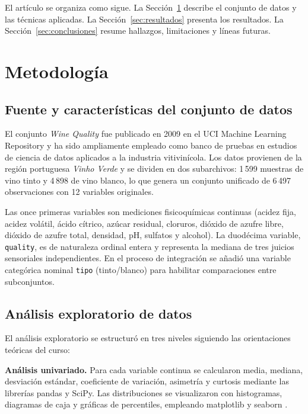 \documentclass[conference]{IEEEtran}
\begin{document}
El artículo se organiza como sigue. La Sección~\ref{sec:metodologia} describe
el conjunto de datos y las técnicas aplicadas. La
Sección~\ref{sec:resultados} presenta los resultados. La
Sección~\ref{sec:conclusiones} resume hallazgos, limitaciones y líneas futuras.

\section{Metodología}
\label{sec:metodologia}

\subsection{Fuente y características del conjunto de datos}

El conjunto \textit{Wine Quality} \cite{cortez2009wine} fue publicado en 2009
en el UCI Machine Learning Repository \cite{uci_repo} y ha sido ampliamente
empleado como banco de pruebas en estudios de ciencia de datos aplicados a la
industria vitivinícola. Los datos provienen de la región portuguesa
\textit{Vinho Verde} y se dividen en dos subarchivos: 1\,599 muestras de vino
tinto y 4\,898 de vino blanco, lo que genera un conjunto unificado de 6\,497
observaciones con 12 variables originales.

Las once primeras variables son mediciones fisicoquímicas continuas (acidez
fija, acidez volátil, ácido cítrico, azúcar residual, cloruros, dióxido de
azufre libre, dióxido de azufre total, densidad, pH, sulfatos y alcohol). La
duodécima variable, \texttt{quality}, es de naturaleza ordinal entera y
representa la mediana de tres juicios sensoriales independientes. En el proceso
de integración se añadió una variable categórica nominal \texttt{tipo}
(tinto/blanco) para habilitar comparaciones entre subconjuntos.

\subsection{Análisis exploratorio de datos}

El análisis exploratorio se estructuró en tres niveles siguiendo las
orientaciones teóricas del curso:

\textbf{Análisis univariado.} Para cada variable continua se calcularon media,
mediana, desviación estándar, coeficiente de variación, asimetría y curtosis
mediante las librerías pandas \cite{pandas} y SciPy. Las distribuciones se
visualizaron con histogramas, diagramas de caja y gráficas de percentiles,
empleando matplotlib \cite{hunter2007matplotlib} y seaborn \cite{seaborn}.
\end{document}

